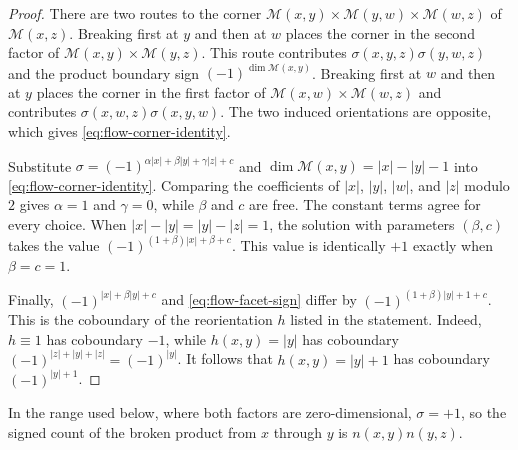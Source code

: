\documentclass[11pt,letterpaper,twoside]{article}
\theoremstyle{plain}
\theoremstyle{definition}
\theoremstyle{remark}
\begin{document}
\begin{proof}
There are two routes to the corner \(\mathcal M(x,y)\times\mathcal M(y,w)\times\mathcal M(w,z)\) of \(\mathcal M(x,z)\).  Breaking first at \(y\) and then at \(w\) places the corner in the second factor of \(\mathcal M(x,y)\times\mathcal M(y,z)\).  This route contributes \(\sigma(x,y,z)\sigma(y,w,z)\) and the product boundary sign \((-1)^{\dim\mathcal M(x,y)}\).  Breaking first at \(w\) and then at \(y\) places the corner in the first factor of \(\mathcal M(x,w)\times\mathcal M(w,z)\) and contributes \(\sigma(x,w,z)\sigma(x,y,w)\).  The two induced orientations are opposite, which gives \eqref{eq:flow-corner-identity}.

Substitute \(\sigma=(-1)^{\alpha|x|+\beta|y|+\gamma|z|+c}\) and \(\dim\mathcal M(x,y)=|x|-|y|-1\) into \eqref{eq:flow-corner-identity}.  Comparing the coefficients of \(|x|\), \(|y|\), \(|w|\), and \(|z|\) modulo \(2\) gives \(\alpha=1\) and \(\gamma=0\), while \(\beta\) and \(c\) are free.  The constant terms agree for every choice.  When \(|x|-|y|=|y|-|z|=1\), the solution with parameters \((\beta,c)\) takes the value \((-1)^{(1+\beta)|x|+\beta+c}\).  This value is identically \(+1\) exactly when \(\beta=c=1\).

Finally, \((-1)^{|x|+\beta|y|+c}\) and \eqref{eq:flow-facet-sign} differ by \((-1)^{(1+\beta)|y|+1+c}\).  This is the coboundary of the reorientation \(h\) listed in the statement.  Indeed, \(h\equiv1\) has coboundary \(-1\), while \(h(x,y)=|y|\) has coboundary \((-1)^{|z|+|y|+|z|}=(-1)^{|y|}\).  It follows that \(h(x,y)=|y|+1\) has coboundary \((-1)^{|y|+1}\).
\end{proof}

In the range used below, where both factors are zero-dimensional, \(\sigma=+1\), so the signed count of the broken product from \(x\) through \(y\) is \(n(x,y)n(y,z)\).
\end{document}

